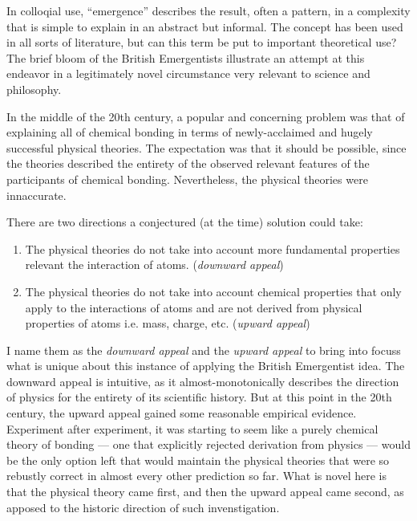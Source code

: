 \documentclass{article}
\newcommand{\ti}[1]{\textit{#1}}
\begin{document}

In colloqial use, ``emergence'' describes the result, often a pattern, in a complexity that is simple to explain in an abstract but informal. The concept has been used in all sorts of literature, but can this term be put to important theoretical use? The brief bloom of the British Emergentists illustrate an attempt at this endeavor in a legitimately novel circumstance very relevant to science and philosophy.

In the middle of the 20th century, a popular and concerning problem was that of explaining all of chemical bonding in terms of newly-acclaimed and hugely successful physical theories. The expectation was that it should be possible, since the theories described the entirety of the observed relevant features of the participants of chemical bonding. Nevertheless, the physical theories were innaccurate.

There are two directions a conjectured (at the time) solution could take:
\begin{enumerate}
\item
    The physical theories do not take into account more fundamental properties relevant the interaction of atoms. (\ti{downward appeal})
\item
    The physical theories do not take into account chemical properties that only apply to the interactions of atoms and are not derived from physical properties of atoms i.e. mass, charge, etc. (\ti{upward appeal})
\end{enumerate}

I name them as the \ti{downward appeal} and the \ti{upward appeal} to bring into focuss what is unique about this instance of applying the British Emergentist idea. The downward appeal is intuitive, as it almost-monotonically describes the direction of physics for the entirety of its scientific history. But at this point in the 20th century, the upward appeal gained some reasonable empirical evidence. Experiment after experiment, it was starting to seem like a purely chemical theory of bonding --- one that explicitly rejected derivation from physics --- would be the only option left that would maintain the physical theories that were so rebustly correct in almost every other prediction so far. What is novel here is that the physical theory came first, and then the upward appeal came second, as apposed to the historic direction of such invenstigation.
\end{document}
